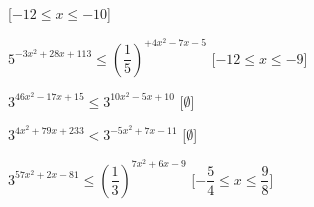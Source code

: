 \begin{esercizio}
\begin{enumeratea}
   \hfill [\(-12 \leqslant x \leqslant -10\)]
  \item  \(5^{-3 x^2 +28 x +113} \leqslant \left(\dfrac{1}{5}\right)^{+4 
x^2 -7 x -5}\)
   \hfill [\(-12 \leqslant x \leqslant -9\)]
  \item  \(3^{46 x^2 -17 x +15} \leqslant 3^{10 x^2 -5 x +10}\)
   \hfill [\(\emptyset\)]
  \item  \(3^{4 x^2 +79 x +233} < 3^{-5 x^2 +7 x -11}\)
   \hfill [\(\emptyset\)]
  \item  \(3^{57 x^2 +2 x -81} \leqslant \left(\dfrac{1}{3}\right)^{7 x^2 
+6 x -9}\)
   \hfill [\(-\dfrac{5}{4} \leqslant x \leqslant \dfrac{9}{8}\)]
 \end{enumeratea}
\end{esercizio}


